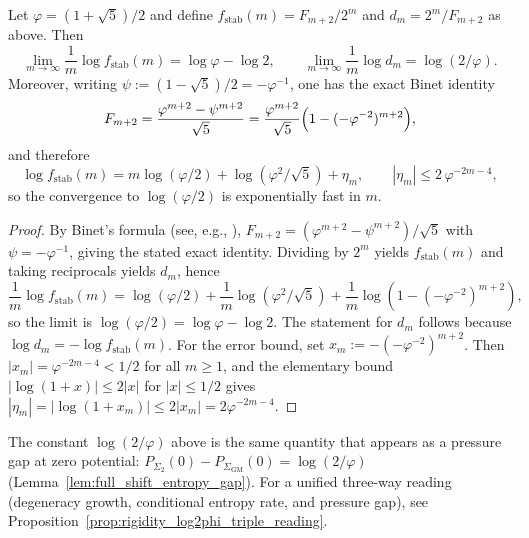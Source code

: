 \begin{lemma}\label{lem:entropy_gap_hidden_exponent_cosmo}
\MathTag Let $\varphi=(1+\sqrt{5})/2$ and define $f_{\mathrm{stab}}(m)=F_{m+2}/2^m$ and $d_m=2^m/F_{m+2}$ as above.
Then
\[
\lim_{m\to\infty}\frac{1}{m}\log f_{\mathrm{stab}}(m)=\log\varphi-\log 2,
\qquad
\lim_{m\to\infty}\frac{1}{m}\log d_m=\log(2/\varphi).
\]
Moreover, writing $\psi:=(1-\sqrt{5})/2=-\varphi^{-1}$, one has the exact Binet identity
\[
F_{m+2}=\frac{\varphi^{m+2}-\psi^{m+2}}{\sqrt{5}}
=\frac{\varphi^{m+2}}{\sqrt{5}}\Bigl(1-(-\varphi^{-2})^{m+2}\Bigr),
\]
and therefore
\[
\log f_{\mathrm{stab}}(m)
=m\log(\varphi/2)+\log(\varphi^2/\sqrt{5})+\eta_m,
\qquad
|\eta_m|\le 2\,\varphi^{-2m-4},
\]
so the convergence to $\log(\varphi/2)$ is exponentially fast in $m$.
\end{lemma}
\begin{proof}
By Binet's formula (see, e.g., \cite{HardyWright2008}),
$
F_{m+2}=(\varphi^{m+2}-\psi^{m+2})/\sqrt{5}
$
with $\psi=-\varphi^{-1}$, giving the stated exact identity.
Dividing by $2^m$ yields $f_{\mathrm{stab}}(m)$ and taking reciprocals yields $d_m$, hence
\[
\frac{1}{m}\log f_{\mathrm{stab}}(m)=\log(\varphi/2)+\frac{1}{m}\log(\varphi^2/\sqrt{5})+\frac{1}{m}\log\!\left(1-(-\varphi^{-2})^{m+2}\right),
\]
so the limit is $\log(\varphi/2)=\log\varphi-\log 2$.
The statement for $d_m$ follows because $\log d_m=-\log f_{\mathrm{stab}}(m)$.
For the error bound, set $x_m:=-(-\varphi^{-2})^{m+2}$.
Then $|x_m|=\varphi^{-2m-4}<1/2$ for all $m\ge 1$, and the elementary bound $|\log(1+x)|\le 2|x|$ for $|x|\le 1/2$ gives
$
|\eta_m|=|\log(1+x_m)|\le 2|x_m|=2\varphi^{-2m-4}.
$
\end{proof}

\begin{remark}\label{rem:entropy_gap_pressure_reading}
\AuditTag The constant $\log(2/\varphi)$ above is the same quantity that appears as a pressure gap at zero potential:
$P_{\Sigma_2}(0)-P_{\Sigma_{\mathrm{GM}}}(0)=\log(2/\varphi)$ (Lemma~\ref{lem:full_shift_entropy_gap}).
For a unified three-way reading (degeneracy growth, conditional entropy rate, and pressure gap), see Proposition~\ref{prop:rigidity_log2phi_triple_reading}.
\end{remark}

